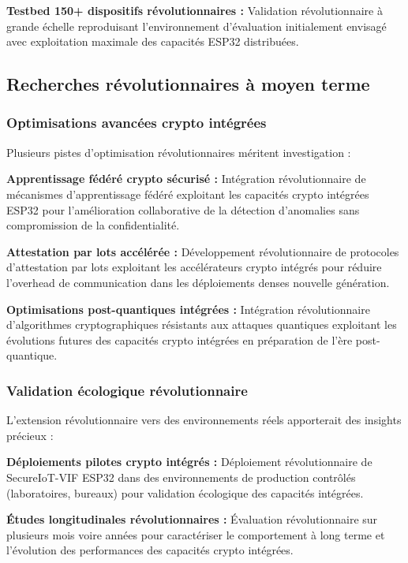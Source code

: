 \textbf{Testbed 150+ dispositifs révolutionnaires :} Validation révolutionnaire à grande échelle reproduisant l'environnement d'évaluation initialement envisagé avec exploitation maximale des capacités ESP32 distribuées.

\subsection{Recherches révolutionnaires à moyen terme}

\subsubsection{Optimisations avancées crypto intégrées}

Plusieurs pistes d'optimisation révolutionnaires méritent investigation :

\textbf{Apprentissage fédéré crypto sécurisé :} Intégration révolutionnaire de mécanismes d'apprentissage fédéré exploitant les capacités crypto intégrées ESP32 pour l'amélioration collaborative de la détection d'anomalies sans compromission de la confidentialité.

\textbf{Attestation par lots accélérée :} Développement révolutionnaire de protocoles d'attestation par lots exploitant les accélérateurs crypto intégrés pour réduire l'overhead de communication dans les déploiements denses nouvelle génération.

\textbf{Optimisations post-quantiques intégrées :} Intégration révolutionnaire d'algorithmes cryptographiques résistants aux attaques quantiques exploitant les évolutions futures des capacités crypto intégrées en préparation de l'ère post-quantique.

\subsubsection{Validation écologique révolutionnaire}

L'extension révolutionnaire vers des environnements réels apporterait des insights précieux :

\textbf{Déploiements pilotes crypto intégrés :} Déploiement révolutionnaire de SecureIoT-VIF ESP32 dans des environnements de production contrôlés (laboratoires, bureaux) pour validation écologique des capacités intégrées.

\textbf{Études longitudinales révolutionnaires :} Évaluation révolutionnaire sur plusieurs mois voire années pour caractériser le comportement à long terme et l'évolution des performances des capacités crypto intégrées.

